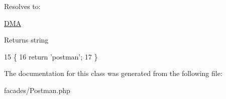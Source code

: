 Resolves to\-:
\begin{DoxyItemize}
\item \hyperlink{namespaceDMA}{D\-M\-A}
\end{DoxyItemize}

\begin{DoxyReturn}{Returns}
string 
\end{DoxyReturn}

\begin{DoxyCode}
15                                                  \{ 
16         \textcolor{keywordflow}{return} \textcolor{stringliteral}{'postman'};
17     \}
\end{DoxyCode}


The documentation for this class was generated from the following file\-:\begin{DoxyCompactItemize}
\item 
facades/Postman.\-php\end{DoxyCompactItemize}
